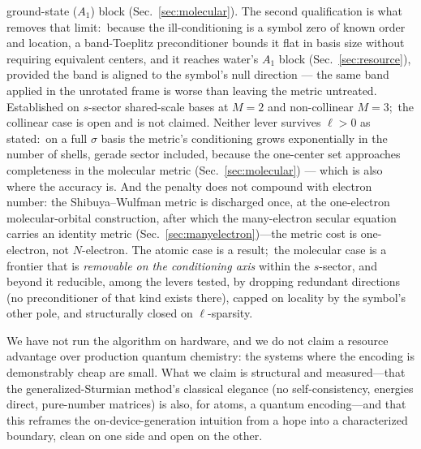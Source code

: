 \documentclass[aps,pra,twocolumn,superscriptaddress,longbibliography]{revtex4-2}
\begin{document}
ground-state ($A_1$) block (Sec.~\ref{sec:molecular}).  The second qualification
is what removes that limit:\ because the ill-conditioning is a symbol zero of
known order and location, a band-Toeplitz preconditioner bounds it flat in basis
size without requiring equivalent centers, and it reaches water's $A_1$ block
(Sec.~\ref{sec:resource}), provided the band is aligned to the symbol's null
direction --- the same band applied in the unrotated frame is worse than leaving
the metric untreated.  Established on $s$-sector shared-scale bases at $M=2$ and non-collinear
$M=3$;\ the collinear case is open and is not claimed.  Neither lever survives
$\ell>0$ as stated:\ on a full $\sigma$ basis the metric's conditioning grows
exponentially in the number of shells, gerade sector included, because the
one-center set approaches completeness in the molecular metric
(Sec.~\ref{sec:molecular}) --- which is also where the accuracy is.  And the penalty does not compound with electron number: the
Shibuya--Wulfman metric is discharged once, at the one-electron molecular-orbital construction,
after which the many-electron secular equation carries an identity metric
(Sec.~\ref{sec:manyelectron})---the metric cost is one-electron, not $N$-electron.  The atomic case is a result;\ the molecular case is a frontier that is
\emph{removable on the conditioning axis} within the $s$-sector, and beyond it reducible, among the
levers tested, by dropping redundant directions (no preconditioner of that kind exists there), capped on locality
by the symbol's other pole, and structurally closed on $\ell$-sparsity.

We have not run the algorithm on hardware, and we do not claim a resource
advantage over production quantum chemistry: the systems where the encoding is
demonstrably cheap are small.  What we claim is structural and measured---that the
generalized-Sturmian method's classical elegance (no self-consistency, energies
direct, pure-number matrices) is also, for atoms, a quantum
encoding---and that this reframes the on-device-generation intuition from a hope
into a characterized boundary, clean on one side and open on the other.
\end{document}
